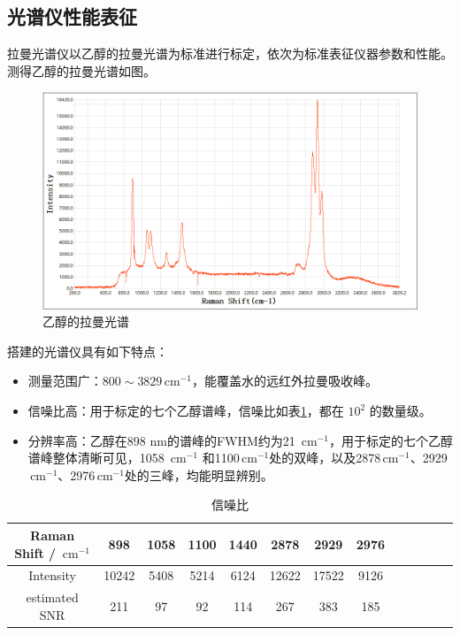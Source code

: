 \documentclass[UTF8]{article}
\newcommand{\dw}[1]{\,\mathrm{#1}}
\begin{document}
	\subsection{光谱仪性能表征}
	拉曼光谱仪以乙醇的拉曼光谱为标准进行标定，依次为标准表征仪器参数和性能。测得乙醇的拉曼光谱如图。
	\begin{figure}[htp]
		\centering
		\includegraphics[width=0.8\linewidth]{figures/乙醇.png}
		\caption{乙醇的拉曼光谱} \label{ethanol}
	\end{figure}

	搭建的光谱仪具有如下特点：	
	\begin{itemize}
		\item 测量范围广：$800 \sim 3829 \dw{cm^{-1}}$，能覆盖水的远红外拉曼吸收峰。
		\item 信噪比高：用于标定的七个乙醇谱峰，信噪比如表\ref{SNR}，都在 $10^2$ 的数量级。
		\item 分辨率高：乙醇在898 nm的谱峰的FWHM约为21 $\dw{cm^{-1}}$，用于标定的七个乙醇谱峰整体清晰可见，1058 $\dw{cm^{-1}}$ 和1100$\dw{cm^{-1}}$处的双峰，以及2878$\dw{cm^{-1}}$、2929$\dw{cm^{-1}}$、2976$\dw{cm^{-1}}$处的三峰，均能明显辨别。
	\end{itemize}

	\begin{table}[htp]
		\centering
		\begin{threeparttable}
			\caption{信噪比}\label{SNR}
			\small %
			\begin{tabular} {ccccccccccccc}
				\toprule
				Raman Shift / $\dw{cm^{-1}}$ & 898 & 1058 & 1100 & 1440 & 2878 & 2929 & 2976 \\
				\midrule
				Intensity & 10242 & 5408 & 5214 & 6124 & 12622 & 17522 & 9126 \\
				estimated SNR & 211 & 97 & 92 & 114 & 267 & 383 & 185 \\
				\bottomrule
			\end{tabular}
		\end{threeparttable}
	\end{table}
	
\end{document}
